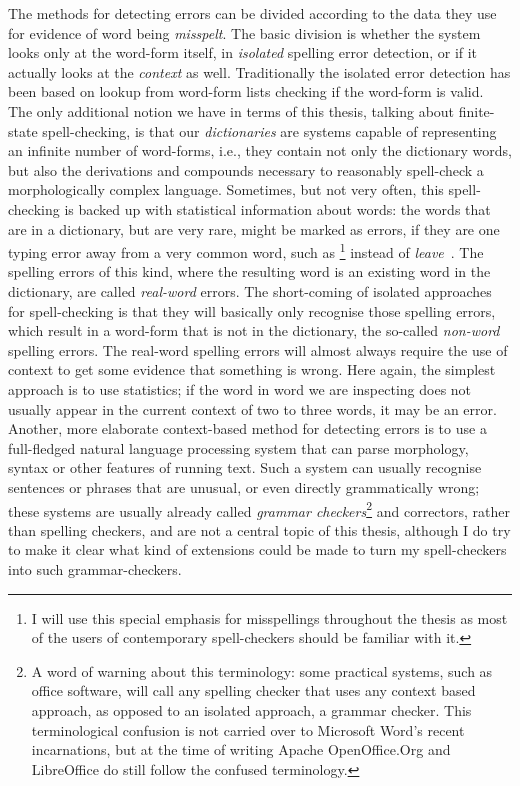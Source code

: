 \documentclass[officiallayout]{unihelcompling}
\newcommand\misspelt{\bgroup\markoverwith
{\textcolor{red}{\lower3.5pt\hbox{\sixly \char58}}}\ULon}
\begin{document}
The methods for detecting errors can be divided according to the data they use
for evidence of word being \emph{misspelt}. The basic division is whether the
system looks only at the word-form itself, in \emph{isolated} spelling error
detection, or if it actually looks at the \emph{context} as well. Traditionally
the isolated error detection has been based on lookup from word-form lists
checking if the word-form is valid. The only additional notion we have in terms
of this thesis, talking about finite-state spell-checking, is that our
\emph{dictionaries} are systems capable of representing an infinite number of
word-forms, i.e., they contain not only the dictionary words, but also the
derivations and compounds necessary to reasonably spell-check a morphologically
complex language. Sometimes, but not very often, this spell-checking is backed
up with statistical information about words: the words that are in a
dictionary, but are very rare, might be marked as errors, if they are one
typing error away from a very common word, such as \misspelt{lave}\footnote{I
    will use this special emphasis for misspellings throughout the thesis as
    most of the users of contemporary spell-checkers should be familiar with
it.} instead of \emph{leave}~\citep{kukich1992techniques}.  The spelling errors
of this kind, where the resulting word is an existing word in the dictionary,
are called \emph{real-word} errors.  The short-coming of isolated approaches
for spell-checking is that they will basically only recognise those spelling
errors, which result in a word-form that is not in the dictionary, the
so-called \emph{non-word} spelling errors. The real-word spelling errors will
almost always require the use of context to get some evidence that something is
wrong. Here again, the simplest approach is to use statistics; if the word in
word we are inspecting does not usually appear in the current context of two to
three words, it may be an error. Another, more elaborate context-based method
for detecting errors is to use a full-fledged natural language processing
system that can parse morphology, syntax or other features of running text.
Such a system can usually recognise sentences or phrases that are unusual, or
even directly grammatically wrong; these systems are usually already called
\emph{grammar checkers}\footnote{A word of warning about this terminology:
    some practical systems, such as office software, will call any spelling
    checker that uses any context based approach, as opposed to an isolated
    approach, a grammar checker. This terminological confusion is not carried
over to Microsoft Word's recent incarnations, but at the time of writing Apache
OpenOffice.Org and LibreOffice do still follow the confused terminology.} and
correctors, rather than spelling checkers, and are not a central topic of this
thesis, although I do try to make it clear what kind of extensions could be
made to turn my spell-checkers into such grammar-checkers.
\end{document}
